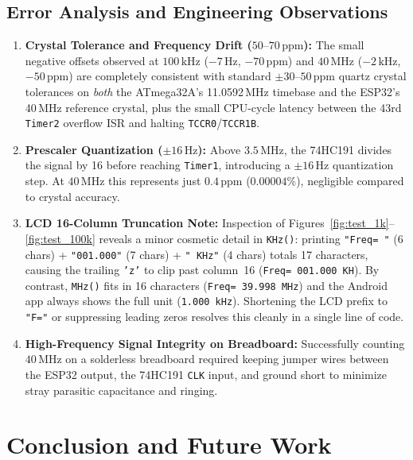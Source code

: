 \documentclass[11pt,a4paper]{article}
\begin{document}
\subsection{Error Analysis and Engineering Observations}
\begin{enumerate}[leftmargin=1.5em]
    \item \textbf{Crystal Tolerance and Frequency Drift ($50\text{--}70\,\text{ppm}$):}
    The small negative offsets observed at $100\,\text{kHz}$ ($-7\,\text{Hz}$, $-70\,\text{ppm}$) and $40\,\text{MHz}$ ($-2\,\text{kHz}$, $-50\,\text{ppm}$) are completely consistent with standard $\pm 30\text{--}50\,\text{ppm}$ quartz crystal tolerances on \emph{both} the ATmega32A's 11.0592\,MHz timebase and the ESP32's 40\,MHz reference crystal, plus the small CPU-cycle latency between the 43rd \texttt{Timer2} overflow ISR and halting \texttt{TCCR0}/\texttt{TCCR1B}.
    \item \textbf{Prescaler Quantization ($\pm 16\,\text{Hz}$):}
    Above $3.5\,\text{MHz}$, the 74HC191 divides the signal by 16 before reaching \texttt{Timer1}, introducing a $\pm 16\,\text{Hz}$ quantization step. At $40\,\text{MHz}$ this represents just $0.4\,\text{ppm}$ ($0.00004\%$), negligible compared to crystal accuracy.
    \item \textbf{LCD 16-Column Truncation Note:}
    Inspection of Figures~\ref{fig:test_1k}--\ref{fig:test_100k} reveals a minor cosmetic detail in \texttt{KHz()}: printing \texttt{"Freq= "} (6 chars) + \texttt{"001.000"} (7 chars) + \texttt{" KHz"} (4 chars) totals 17 characters, causing the trailing \texttt{'z'} to clip past column~16 (\texttt{Freq= 001.000 KH}). By contrast, \texttt{MHz()} fits in 16 characters (\texttt{Freq= 39.998 MHz}) and the Android app always shows the full unit (\texttt{1.000 kHz}). Shortening the LCD prefix to \texttt{"F="} or suppressing leading zeros resolves this cleanly in a single line of code.
    \item \textbf{High-Frequency Signal Integrity on Breadboard:}
    Successfully counting $40\,\text{MHz}$ on a solderless breadboard required keeping jumper wires between the ESP32 output, the 74HC191 \texttt{CLK} input, and ground short to minimize stray parasitic capacitance and ringing.
\end{enumerate}

\section{Conclusion and Future Work}
\end{document}
